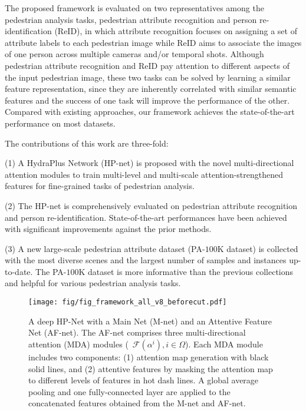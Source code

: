 \documentclass[10pt,twocolumn,letterpaper]{article}
\begin{document}
The proposed framework is evaluated on two representatives among the pedestrian analysis tasks, \ie pedestrian attribute recognition and person re-identification (ReID), in which attribute recognition focuses on assigning a set of attribute labels to each pedestrian image while ReID aims to associate the images of one person across multiple cameras and/or temporal shots.
%
Although pedestrian attribute recognition and ReID pay attention to different aspects of the input pedestrian image, these two tasks can be solved by learning a similar feature representation, since they are inherently correlated with similar semantic features and the success of one task will improve the performance of the other.
%
Compared with existing approaches, our framework achieves the state-of-the-art performance on most datasets.





The contributions of this work are three-fold:

(1) A HydraPlus Network (HP-net) is proposed with the novel multi-directional attention modules to train multi-level and multi-scale attention-strengthened features for fine-grained tasks of pedestrian analysis.
%

(2) The HP-net is comprehensively evaluated on pedestrian attribute recognition and person re-identification.
%
State-of-the-art performances have been achieved with significant improvements against the prior methods.

(3) A new large-scale pedestrian attribute dataset (PA-$100$K dataset) is collected with the most diverse scenes and the largest number of samples and instances up-to-date.
%
The PA-$100$K dataset is more informative than the previous collections and helpful for various pedestrian analysis tasks.







\begin{figure}[t]
\centering
\texttt{[image: fig/fig\_framework\_all\_v8\_beforecut.pdf]}
\caption{A deep HP-Net with a Main Net (M-net) and an Attentive Feature Net (AF-net). The AF-net comprises three multi-directional attention (MDA) modules (\ie~$\mathcal{F}(\alpha^i), i\in\Omega$). Each MDA module includes two components: (1) attention map generation with black solid lines, and (2) attentive features by masking the attention map to different levels of features in hot dash lines. A global average pooling and one fully-connected layer are applied to the concatenated features obtained from the M-net and AF-net.
}
\label{fig:framework}
\end{figure}
\end{document}
